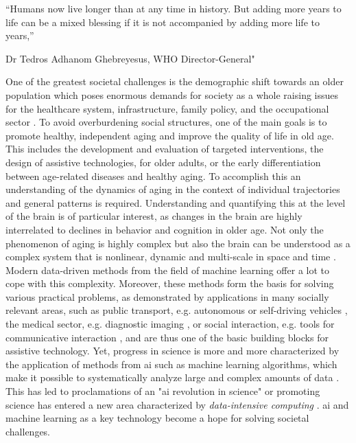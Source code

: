 \setlength{\epigraphwidth}{0.6\textwidth}
\epigraph{\centering “Humans now live longer than at any time in history. But adding more years to life can be a mixed blessing if it is not accompanied by adding more life to years,”} {Dr Tedros Adhanom Ghebreyesus, WHO Director-General"}

One of the greatest societal challenges is the demographic shift towards an older population which poses enormous demands for society as a whole raising issues for the healthcare system, infrastructure, family policy, and the occupational sector \cite{who_aging2023}. To avoid overburdening social structures, one of the main goals is to promote healthy, independent aging and improve the quality of life in old age. This includes the development and evaluation of targeted interventions, the design of assistive technologies, for older adults, or the early differentiation between age-related diseases and healthy aging. To accomplish this an understanding of the dynamics of aging in the context of individual trajectories and general patterns is required. Understanding and quantifying this at the level of the brain is of particular interest, as changes in the brain are highly interrelated to declines in behavior and cognition in older age. Not only the phenomenon of aging is highly complex but also the brain can be understood as a complex system that is nonlinear, dynamic and multi-scale in space and time \cite{Betzel2017}.\\ 
Modern data-driven methods from the field of machine learning offer a lot to cope with this complexity. Moreover, these methods form the basis for solving various practical problems, as demonstrated by applications in many socially relevant areas, such as public transport, e.g. autonomous or self-driving vehicles \cite{Leonard2020}, the medical sector, e.g. diagnostic imaging \cite{Liu2020}, or social interaction, e.g. tools for communicative interaction \cite{Adamopoulou2020}, and are thus one of the basic building blocks for assistive technology. Yet, progress in science is more and more characterized by the application of methods from \gls{ai} such as machine learning algorithms, which make it possible to systematically analyze large and complex amounts of data \cite{Brunton2019}. This has led to proclamations of an "\gls{ai} revolution in science" \cite{Appenzeller2017} or promoting science has entered a new area characterized by \textit{data-intensive computing} \cite{Hey2009}. \Gls{ai} and machine learning as a key technology become a hope for solving societal challenges.\\ 
